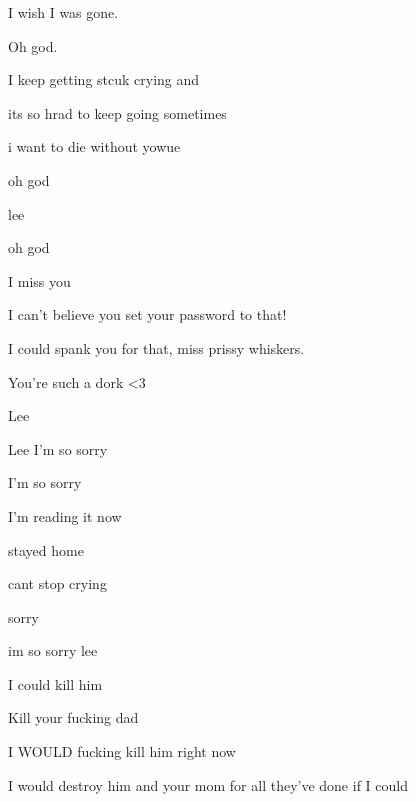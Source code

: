 { I wish I was gone.

 Oh god.

 I keep getting stcuk crying and

 its so hrad to keep going sometimes

 i want to die without yowue

 oh god

 lee

 oh god

\nopagebreak

 I miss you

\nopagebreak

 I can't believe you set your password to that!

 I could spank you for that, miss prissy whiskers.

 You're such a dork \textless{}3

\nopagebreak

 Lee

 Lee I'm so sorry

 I'm so sorry

 I'm reading it now

 stayed home

 cant stop crying

 sorry

 im so sorry lee

 I could kill him

 Kill your fucking dad

 I WOULD fucking kill him right now

 I would destroy him and your mom for all they've done if I could

\vspace{-1ex}

\nopagebreak

}
